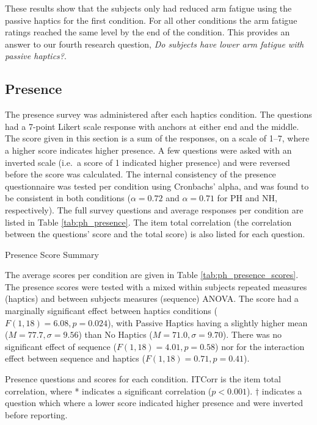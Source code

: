 These results show that the subjects only had reduced arm fatigue using the passive haptics for the first condition.
For all other conditions the arm fatigue ratings reached the same level by the end of the condition.
This provides an answer to our fourth research question, \emph{Do subjects have lower arm fatigue with passive haptics?}.

\subsection{Presence}

The presence survey was administered after each haptics condition.
The questions had a 7-point Likert scale response with anchors at either end and the middle.
The score given in this section is a sum of the responses, on a scale of \numrange{1}{7}, where a higher score indicates higher presence.
A few questions were asked with an inverted scale (i.e.\ a score of 1 indicated higher presence) and were reversed before the score was calculated.
The internal consistency of the presence questionnaire was tested per condition using Cronbachs' alpha, and was found to be consistent in both conditions ($\alpha=0.72$ and $\alpha=0.71$ for PH and NH, respectively).
The full survey questions and average responses per condition are listed in Table \ref{tab:ph_presence}.
The item total correlation (the correlation between the questions' score and the total score) is also listed for each question.

\begin{table}
    \centering
    \small
    \caption{Presence Score Summary}
    \label{tab:ph_presence_scores}
\end{table}

The average scores per condition are given in Table \ref{tab:ph_presence_scores}.
The presence scores were tested with a mixed within subjects repeated measures (haptics) and between subjects measures (sequence) ANOVA.
The score had a marginally significant effect between haptics conditions ($F(1,18)=6.08, p=0.024$), with Passive Haptics having a slightly higher mean ($M=77.7, \sigma=9.56$) than No Haptics ($M=71.0, \sigma=9.70$).
There was no significant effect of sequence ($F(1,18)=4.01, p=0.58$) nor for the interaction effect between sequence and haptics ($F(1,18)=0.71, p=0.41$).

\begin{sidewaystable}
    \centering
    \caption{Presence questions and scores for each condition. ITCorr is the item total correlation, where * indicates a significant correlation ($p<0.001$). $\dagger$ indicates a question which where a lower score indicated higher presence and were inverted before reporting.}
    \label{tab:ph_presence}
\end{sidewaystable}

